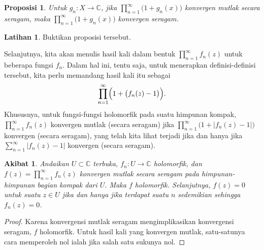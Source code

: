 \documentclass[12pt,openany]{book}
\newcommand{\sabs}[1]{\lvert {#1} \rvert}
\newcommand{\C}{{\mathbb{C}}}
\theoremstyle{plain}
\newtheorem{prop}[thm]{Proposisi}
\newtheorem{cor}[thm]{Akibat}
\theoremstyle{remark}
\theoremstyle{definition}
\newenvironment{exbox}{%
    \def\FrameCommand{\vrule width 1pt \relax\hspace{10pt}}%
    \MakeFramed{\advance\hsize-\width\FrameRestore}%
}{%
    \endMakeFramed
}
\theoremstyle{exercise}
\newtheorem{exercise}{Latihan}[section]
\theoremstyle{example}
\begin{document}
\begin{prop} \label{prop:unifabsconvprod}
Untuk $g_n \colon X \to \C$, jika
$\prod_{n=1}^{\infty} \bigl(1+g_n(x)\bigr)$ 
konvergen mutlak secara seragam, maka
$\prod_{n=1}^{\infty} \bigl(1+g_n(x)\bigr)$ 
konvergen seragam.
\end{prop}

\begin{exbox}
\begin{exercise}
Buktikan proposisi tersebut.
\end{exercise}
\end{exbox}

Selanjutnya,
kita akan menulis hasil kali dalam bentuk $\prod_{n=1}^\infty f_n(z)$
untuk beberapa fungsi $f_n$.
Dalam hal ini, tentu saja, untuk menerapkan definisi-definisi tersebut, kita perlu memandang
hasil kali itu sebagai
\begin{equation*}
\prod_{n=1}^\infty \Bigl( 1 + \bigl(f_n(z)-1\bigr) \Bigr).
\end{equation*}
Khususnya, untuk fungsi-fungsi holomorfik pada suatu himpunan kompak,
$\prod_{n=1}^\infty f_n(z)$ konvergen mutlak (secara seragam) 
jika 
$\prod_{n=1}^\infty \bigl( 1 + \sabs{f_n(z)-1} \bigr)$
konvergen (secara seragam),
yang telah kita lihat terjadi jika dan hanya jika
$\sum_{n=1}^\infty \sabs{f_n(z)-1}$ konvergen (secara seragam).

\begin{cor}
Andaikan $U \subset \C$ terbuka, $f_n \colon U \to \C$ holomorfik,
dan $f(z) = \prod_{n=1}^\infty f_n(z)$ konvergen mutlak secara seragam
pada himpunan-himpunan bagian kompak dari $U$.  Maka $f$ holomorfik.  Selanjutnya, $f(z)=0$
untuk suatu $z \in U$
jika dan hanya jika terdapat suatu $n$ sedemikian sehingga $f_n(z)=0$.
\end{cor}

\begin{proof}
Karena konvergensi mutlak seragam mengimplikasikan konvergensi seragam, $f$
holomorfik.  Untuk hasil kali yang konvergen mutlak, satu-satunya
cara memperoleh nol ialah jika salah satu sukunya nol.
\end{proof}
\end{document}
